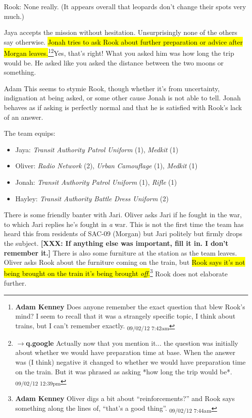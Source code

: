 Rook: None really.  (It appears overall that leopards don't change their spots very much.)



Jaya accepts the mission without hesitation.  Unsurprisingly none of the others say otherwise.  \hl{Jonah tries to ask Rook about further preparation or advice after Morgan leaves.}\footnote{\textbf{Adam Kenney }Does anyone remember the exact question that blew Rook's mind?  I seem to recall that it was a strangely specific topic, I think about trains, but I can't remember exactly. \textsubscript{09/02/12 7:42am}}\footnote{$\rightarrow$\textbf{q.google }Actually now that you mention it... the question was initially about whether we would have preparation time at base.  When the answer was (I think) negative it changed to whether we would have preparation time on the train.  But it was phrased as asking *how long the trip would be*. \textsubscript{09/02/12 12:39pm}}Yes, that's right!  What you asked him was how long the trip would be.  He 
asked like you asked the distance between the two moons or something. 
 
    Adam  This seems to stymie Rook, though whether it's from uncertainty, indignation at being asked, or some other cause Jonah is not able to tell.   Jonah behaves as if asking is perfectly normal and that he is satisfied with Rook's lack of an answer.



The team equips:

\begin{itemize}
\item Jaya:\textit{ Transit Authority Patrol Uniform} (1),  \textit{Medkit} (1)
\item Oliver:\textit{ Radio Network} (2),\textit{ Urban Camouflage} (1),\textit{ Medkit} (1)
\item Jonah:\textit{ Transit Authority Patrol Uniform} (1),\textit{  Rifle} (1)
\item Hayley:\textit{ Transit Authority Battle Dress Uniform} (2)
\end{itemize}



There is some friendly banter with Jari.  Oliver asks Jari if he fought in the war, to which Jari replies he's fought in\textit{ a} war.  This is not the first time the team has heard this from residents of SAC-09 (Morgan) but Jari politely but firmly drops the subject.  \textbf{{[}XXX: If anything else was important, fill it in.  I don't remember it.{]}}  There is also some furniture at the station as the team leaves.  Oliver asks Rook about the furniture coming on the train, but \hl{Rook says it's not being brought on the train it's being brought\textit{ off}.}\footnote{\textbf{Adam Kenney }Oliver digs a bit about ``reinforcements?'' and Rook says something along the lines of, ``that's a good thing''. \textsubscript{09/02/12 7:44am}}  Rook does not elaborate further.



